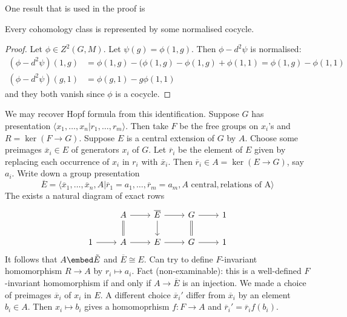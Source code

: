 \documentclass[a4paper]{article}
\begin{document}
One result that is used in the proof is

\begin{lemma}
  Every cohomology class is represented by some normalised cocycle.
\end{lemma}

\begin{proof}
  Let \(\phi \in Z^2(G, M)\). Let \(\psi(g) = \phi(1, g)\). Then \(\phi - d^2\psi\) is normalised:
  \begin{align*}
    (\phi - d^2\psi)(1, g)
    &= \phi(1, g) - (\phi(1, g) - \phi(1, g) + \phi(1, 1)
      = \phi(1, g) - \phi(1, 1) \\
    (\phi - d^2\psi)(g, 1)
    &= \phi(g, 1) - g \phi(1, 1)
  \end{align*}
  and they both vanish since \(\phi\) is a cocycle.
\end{proof}

We may recover Hopf formula from this identification. Suppose \(G\) has presentation \(\langle x_1, \dots, x_n | r_1, \dots, r_m \rangle\). Then take \(F\) be the free groups on \(x_i\)'s and \(R = \ker (F \to G)\). Suppose \(E\) is a central extension of \(G\) by \(A\). Choose some preimages \(\overline x_i \in E\) of generators \(x_i\) of \(G\). Let \(\overline r_i\) be the element of \(E\) given by replacing each occurrence of \(x_i\) in \(r_i\) with \(\overline x_i\). Then \(\overline r_i \in A = \ker (E \to G)\), say \(a_i\). Write down a group presentation
\[
  \overline E = \langle \overline x_1, \dots, \overline x_n, A | \overline r_1 = a_1, \dots, \overline r_m = a_m, A \text{ central}, \text{relations of A}\rangle
\]
The exists a natural diagram of exact rows
\[
  \begin{tikzcd}
    & A \ar[r] \ar[d, equal] & \overline E \ar[r] \ar[d] & G \ar[r] \ar[d, equal] & 1 \\
    1 \ar[r] & A \ar[r] & E \ar[r] & G \ar[r] & 1
  \end{tikzcd}
\]
It follows that \(A \embed \tilde E\) and \(\overline E \cong E\). Can try to define \(F\)-invariant homomorphism \(R \to A\) by \(r_i \mapsto a_i\). Fact (non-examinable): this is a well-defined \(F\)-invariant homomorphism if and only if \(A \to \overline E\) is an injection. We made a choice of preimages \(\overline x_i\) of \(x_i\) in \(E\). A different choice \(\overline x_i'\) differ from \(\overline x_i\) by an element \(b_i \in A\). Then \(x_i \mapsto b_i\) gives a homomoprhism \(f: F \to A\) and \(\overline r_i' = \overline r_i f(b_i)\).
\end{document}
